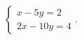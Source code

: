 $\displaystyle
\left\{
\begin{array}{l}
\displaystyle x - 5y = 2 \\
\displaystyle 2x - 10y = 4
\end{array}
\right.
$.
